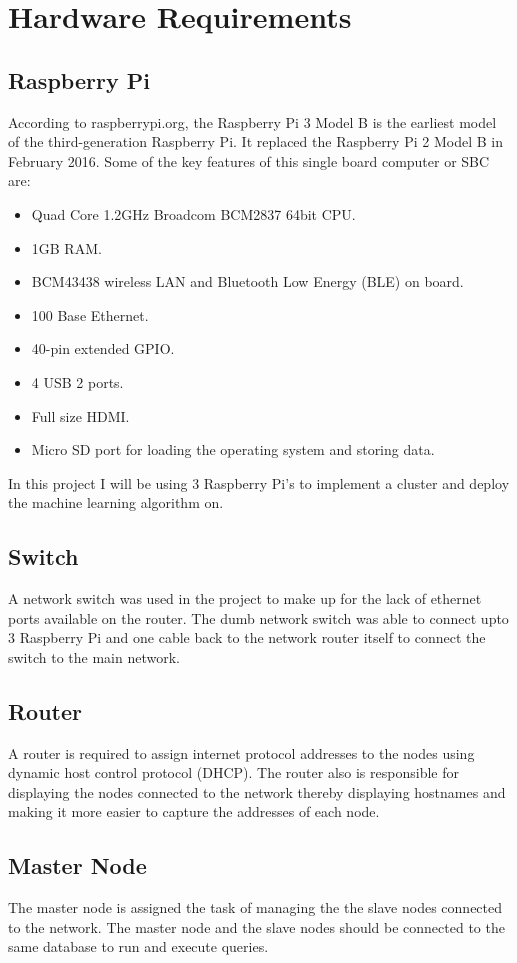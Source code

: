 \documentclass[12pt]{article}
\begin{document}
\newpage
\section{Hardware Requirements}
\subsection{Raspberry Pi}

According to raspberrypi.org, the Raspberry Pi 3 Model B is the earliest model of the third-generation Raspberry Pi. It replaced the Raspberry Pi 2 Model B in February 2016. Some of the key features of this single board computer or SBC are:
\begin{itemize}
\item Quad Core 1.2GHz Broadcom BCM2837 64bit CPU.
\item 1GB RAM.
\item BCM43438 wireless LAN and Bluetooth Low Energy (BLE) on board.
\item 100 Base Ethernet.
\item 40-pin extended GPIO.
\item 4 USB 2 ports.
\item Full size HDMI.
\item Micro SD port for loading the operating system and storing data.
\end{itemize}
In this project I will be using 3 Raspberry Pi's to implement a cluster and deploy the machine learning algorithm on.

\subsection{Switch}
A network switch was used in the project to make up for the lack of ethernet ports available on the router. The dumb network switch 
was able to connect upto 3 Raspberry Pi and one cable back to the network router itself to connect the switch to the main network.

\subsection{Router}
A router is required to assign internet protocol addresses to the nodes using dynamic host control protocol (DHCP). The router also is responsible for displaying the nodes connected to the network thereby displaying hostnames and making it more easier to capture the addresses of each node.

\subsection{Master Node}
The master node is assigned the task of managing the the slave nodes connected to the network. The master node and the slave nodes should be connected to the same database to run and execute queries.
\end{document}
